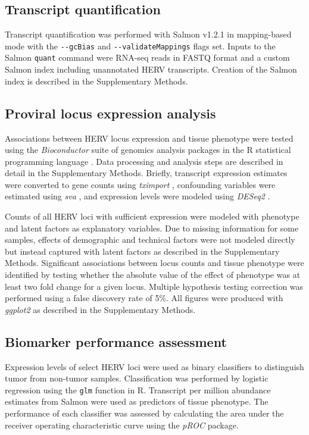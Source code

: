 \subsection*{Transcript quantification}
Transcript quantification was performed with Salmon v1.2.1 \citep{Patro2017} in mapping-based mode with the \verb|--gcBias| and \verb|--validateMappings| flags set.
Inputs to the Salmon \verb|quant| command were RNA-seq reads in FASTQ format and a custom Salmon index including unannotated HERV transcripts.
Creation of the Salmon index is described in the Supplementary Methods.

\subsection*{Proviral locus expression analysis}
Associations between HERV locus expression and tissue phenotype were tested using the \emph{Bioconductor} suite of genomics analysis packages \citep{bioc} in the R statistical programming language \citep{R}.
Data processing and analysis steps are described in detail in the Supplementary Methods.
Briefly, transcript expression estimates were converted to gene counts using \emph{tximport} \citep{Soneson2015}, confounding variables were estimated using \emph{sva} \citep{sva}, and expression levels were modeled using \emph{DESeq2} \citep{Love2014}.

Counts of all HERV loci with sufficient expression were modeled with phenotype and latent factors as explanatory variables.
Due to missing information for some samples, effects of demographic and technical factors were not modeled directly but instead captured with latent factors as described in the Supplementary Methods.
Significant associations between locus counts and tissue phenotype were identified by testing whether the absolute value of the effect of phenotype was at least two fold change for a given locus.
Multiple hypothesis testing correction was performed using a false discovery rate of 5\%.
All figures were produced with \emph{ggplot2} \citep{Wickham2016} as described in the Supplementary Methods.

\subsection*{Biomarker performance assessment}
Expression levels of select HERV loci were used as binary classifiers to distinguish tumor from non-tumor samples.
Classification was performed by logistic regression using the \verb|glm| function in R.
Transcript per million abundance estimates from Salmon were used as predictors of tissue phenotype.
The performance of each classifier was assessed by calculating the area under the receiver operating characteristic curve using the \emph{pROC} \citep{pROC} package.
